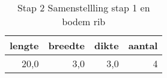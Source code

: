 \begin{table}[h!]
\centering
\caption{Stap 2 Samenstellling stap 1 en bodem rib}
\begin{tabular}{rrrr}
\toprule
 lengte &  breedte &  dikte &  aantal \\
\midrule
   20,0 &      3,0 &    3,0 &       4 \\
\bottomrule
\end{tabular}
\end{table}
